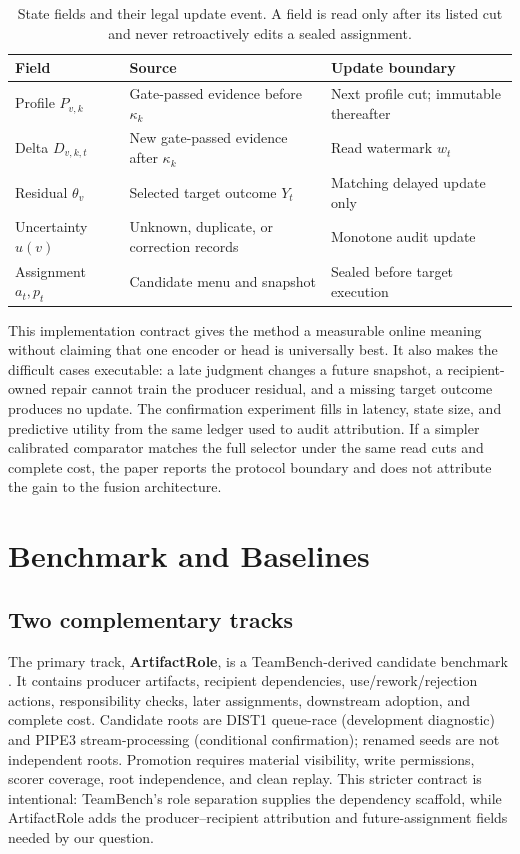 \documentclass[sigconf,anonymous]{aamas}
\begin{document}
\begin{table}[t]
\centering\scriptsize
\setlength{\tabcolsep}{2pt}
\caption{State fields and their legal update event. A field is read only after its listed cut and never retroactively edits a sealed assignment.}
\label{tab:state-contract}
\begin{tabular}{p{}p{}p{}}
\toprule
Field & Source & Update boundary \\
\midrule
Profile $P_{v,k}$ & Gate-passed evidence before $\kappa_k$ & Next profile cut; immutable thereafter \\
Delta $D_{v,k,t}$ & New gate-passed evidence after $\kappa_k$ & Read watermark $w_t$ \\
Residual $\theta_v$ & Selected target outcome $Y_t$ & Matching delayed update only \\
Uncertainty $u(v)$ & Unknown, duplicate, or correction records & Monotone audit update \\
Assignment $a_t,p_t$ & Candidate menu and snapshot & Sealed before target execution \\
\bottomrule
\end{tabular}
\end{table}

This implementation contract gives the method a measurable online meaning without claiming that one encoder or head is universally best. It also makes the difficult cases executable: a late judgment changes a future snapshot, a recipient-owned repair cannot train the producer residual, and a missing target outcome produces no update. The confirmation experiment fills in latency, state size, and predictive utility from the same ledger used to audit attribution. If a simpler calibrated comparator matches the full selector under the same read cuts and complete cost, the paper reports the protocol boundary and does not attribute the gain to the fusion architecture.

\section{Benchmark and Baselines}
\label{sec:benchmark}

\subsection{Two complementary tracks}
The primary track, \textbf{ArtifactRole}, is a TeamBench-derived candidate benchmark \cite{kim2026teambench}. It contains producer artifacts, recipient dependencies, use/rework/rejection actions, responsibility checks, later assignments, downstream adoption, and complete cost. Candidate roots are DIST1 queue-race (development diagnostic) and PIPE3 stream-processing (conditional confirmation); renamed seeds are not independent roots. Promotion requires material visibility, write permissions, scorer coverage, root independence, and clean replay. This stricter contract is intentional: TeamBench's role separation supplies the dependency scaffold, while ArtifactRole adds the producer--recipient attribution and future-assignment fields needed by our question.
\end{document}
